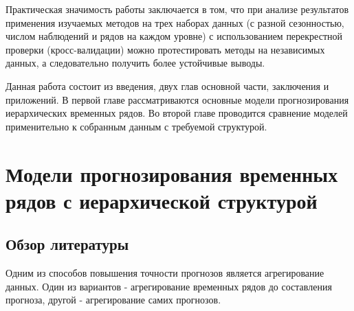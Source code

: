 \documentclass[12pt,a4paper, oneside]{extreport}
\begin{document}

Практическая значимость работы заключается в том, что при анализе результатов применения изучаемых методов на трех наборах данных (с разной сезонностью, числом наблюдений и рядов на каждом уровне)   с использованием перекрестной проверки (кросс-валидации) можно протестировать методы на независимых данных, а следовательно получить более устойчивые  выводы. 



Данная работа состоит из введения, двух глав основной части, заключения и приложений. В первой главе рассматриваются основные модели прогнозирования иерархических временных рядов.  Во второй главе проводится  сравнение моделей применительно к собранным данным с требуемой структурой. 









\chapter{Модели прогнозирования временных рядов с иерархической структурой}



\section{Обзор литературы}

Одним из способов повышения точности прогнозов является агрегирование данных. Один из вариантов - агрегирование временных рядов до составления прогноза, другой - агрегирование самих прогнозов. 
\end{document}
